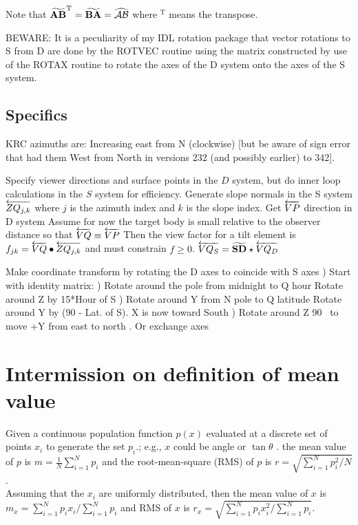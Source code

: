 \documentclass{article}
\begin{document}
Note that $\widetilde {\mathbf{ AB }}^\mathrm{T} = \widetilde {\mathbf{ BA }}  = \widehat {\mathcal{AB}} $
where $^\mathrm{T}$ means the transpose.

BEWARE: It is a peculiarity of my IDL rotation package that vector rotations to
S from D are done by the ROTVEC routine using the  matrix constructed by
use of the ROTAX routine to rotate the axes of the D system onto the axes of the
S system.


\subsection{Specifics \label{geos} }
KRC azimuths are: Increasing east from N (clockwise) [but be aware of sign
  error that had them West from North in versions 232 (and possibly earlier) to
  342].

 Specify viewer directions and surface points in the $D$ system, but do inner
 loop calculations in the $S$ system for efficiency. Generate slope normals in
 the S system $\overleftarrow{ZQ_{j,k}}$ where $j$ is the azimuth index and $k$ is the
 slope index.
\qi Get $\overleftarrow{VP}  $ direction in D system
\qii Assume for now the target body is small relative to the observer distance so that $\overleftarrow{VQ} \equiv \overleftarrow{VP}$ 
\qi Then the view factor for a tilt element is  $f_{jk}=\overleftarrow{VQ} \bullet \overleftarrow{ZQ_{j,k}} $ and must constrain  $f \geq 0$.
\qi $\overleftarrow{VQ_S} = \widetilde {\mathbf{ SD }} \star  \overleftarrow{VQ_D}$  

Make  coordinate transform by rotating the D axes to coincide with S axes
) Start with identity matrix: 
) Rotate around the pole from midnight to Q hour \qt Rotate around Z by 15*Hour of S
) Rotate around Y from N pole to Q latitude \qt Rotate around Y by (90 - Lat. of S). X is now toward South
) Rotate around Z 90\qd~ to move +Y from east to north \qt . Or exchange axes

\section{Intermission on definition of mean value}

Given a continuous population function $p(x)$ evaluated at a discrete set of points $x_i$ to generate the set $p_i$.; e.g., $x$ could be angle or $\tan \theta$ .
\qi the mean value of $p$ is $ m=\frac{1}{N} \sum_{i=1}^N p_i $ and
 the root-mean-square (RMS) of $p$ is $ r=\sqrt{ \sum_{i=1}^N p_i^2 \big/ N }$.
\\ Assuming that the $x_i$ are uniformly distributed, then
\qi the mean value of $x$ is $ m_x=\sum_{i=1}^N p_i x_i \big/ \sum_{i=1}^N p_i $ 
and RMS of $x$ is 
$ r_x=\sqrt{ \sum_{i=1}^N p_i  x^2_i  \big/ \sum_{i=1}^N p_i }$.
\end{document}
